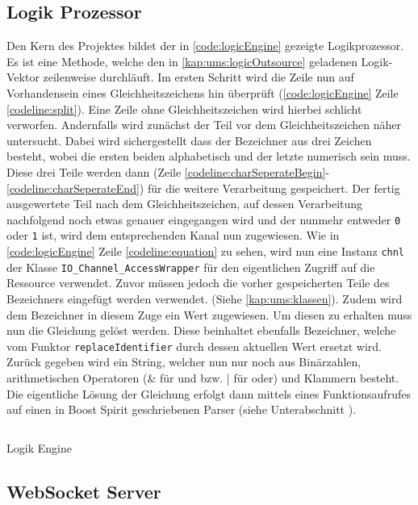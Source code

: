 \subsection{Logik Prozessor}\label{kap:ums:logicProcessor}
Den Kern des Projektes bildet der in \autoref{code:logicEngine} gezeigte Logikprozessor. Es ist eine Methode, welche den in \autoref{kap:ums:logicOutsource} geladenen Logik-Vektor zeilenweise durchläuft. Im ersten Schritt wird die Zeile nun auf Vorhandensein eines Gleichheitszeichens hin überprüft (\autoref{code:logicEngine} Zeile \ref{codeline:split}). Eine Zeile ohne Gleichheitszeichen wird hierbei schlicht verworfen. Andernfalls wird zunächst der Teil vor dem Gleichheitszeichen näher untersucht. Dabei wird sichergestellt dass der Bezeichner aus drei Zeichen besteht, wobei die ersten beiden alphabetisch und der letzte numerisch sein muss. Diese drei Teile werden dann (Zeile \ref{codeline:charSeperateBegin}-\ref{codeline:charSeperateEnd}) für die weitere Verarbeitung gespeichert. Der fertig ausgewertete Teil nach dem Gleichheitszeichen, auf dessen Verarbeitung nachfolgend noch etwas genauer eingegangen wird und der nunmehr entweder \texttt{0} oder \texttt{1} ist, wird dem entsprechenden Kanal nun zugewiesen. Wie in \autoref{code:logicEngine} Zeile \ref{codeline:equation} zu sehen, wird nun eine Instanz \texttt{chnl} der Klasse \texttt{IO\_Channel\_AccessWrapper} für den eigentlichen Zugriff auf die Ressource verwendet. Zuvor müssen jedoch die vorher gespeicherten Teile des Bezeichners eingefügt werden verwendet. (Siehe \autoref{kap:ums:klassen}). 
Zudem wird dem Bezeichner in diesem Zuge ein Wert zugewiesen. Um diesen zu erhalten muss nun die Gleichung gelöst werden. Diese beinhaltet ebenfalls Bezeichner, welche vom Funktor \texttt{replaceIdentifier} durch dessen aktuellen Wert ersetzt wird. Zurück gegeben wird ein String, welcher nun nur noch aus Binärzahlen, arithmetischen Operatoren (\& für und bzw. | für oder) und Klammern besteht. Die eigentliche Lösung der Gleichung erfolgt dann mittels eines Funktionsaufrufes auf einen in Boost Spirit geschriebenen Parser (siehe Unterabschnitt ). 
\begin{listing}[H]

	\inputminted[numbersep=1pt,linenos=true, mathescape, numbers=left, fontsize=\scriptsize,frame=single, firstline=186,lastline=222]{c}{./code/main-klassenstruktur.cpp}
	\caption{Logik Engine}
	\label{code:logicEngine}
\end{listing}
\subsection{WebSocket Server}

